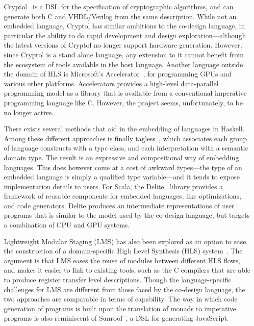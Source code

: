\documentclass[../paper.tex]{subfiles}
\begin{document}
Cryptol~\cite{cryptol} is a DSL for the specification of cryptographic algorithms, and can generate both C and VHDL/Verilog from the same description. While not an embedded language, Cryptol has similar ambitions to the co-design language, in particular the ability to do rapid development and design exploration---although the latest versions of Cryptol no longer support hardware generation. However, since Cryptol is a stand alone language, any extension to it cannot benefit from the ecosystem of tools available in the host language. Another language outside the domain of HLS is Microsoft's Accelerator~\cite{accelerator}, for programming GPUs and various other platforms. Accelerators provides a high-level data-parallel programming model as a library that is available from a conventional imperative programming language like C. However, the project seems, unfortunately, to be no longer active.

There exists several methods that aid in the embedding of languages in Haskell. Among these different approaches is finally tagless~\cite{carette2009}, which associates each group of language constructs with a type class, and each interpretation with a semantic domain type. The result is an expressive and compositional way of embedding languages. This does however come at a cost of awkward types---the type of an embedded language is simply a qualified type variable---and it tends to expose implementation details to users. For Scala, the Delite~\cite{arvind2014} library provides a framework of reusable components for embedded languages, like optimizations, and code generators. Delite produces an intermediate representations of user programs that is similar to the model used by the co-design language, but targets a combination of CPU and GPU systems.

Lightweight Modular Staging (LMS) has also been explored as an option to ease the construction of a domain-specific High Level Synthesis (HLS) system~\cite{george2013}. The argument is that LMS eases the reuse of modules between different HLS flows, and makes it easier to link to existing tools, such as the C compilers that are able to produce register transfer level descriptions. Though the language-specific challenges for LMS are different from those faced by the co-design language, the two approaches are comparable in terms of capability. The way in which code generation of programs is built upon the translation of monads to imperative programs is also reminiscent of Sunroof~\cite{gill2014}, a DSL for generating JavaScript.
\end{document}
